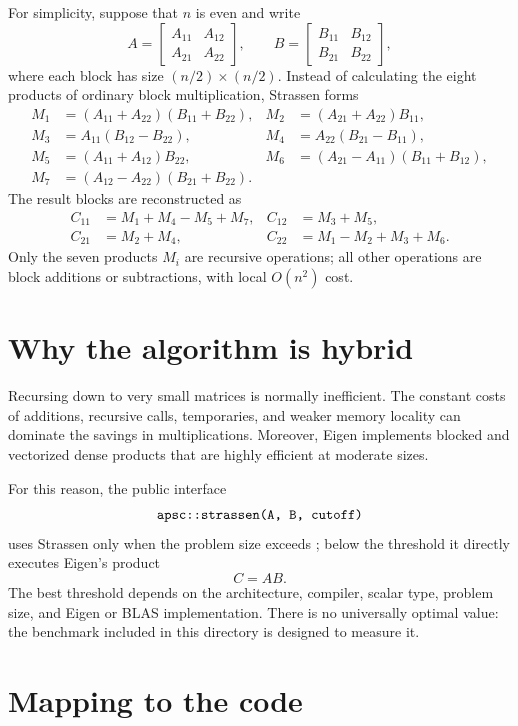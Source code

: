 \documentclass[11pt,a4paper]{article}
\newcommand{\code}[1]{\texttt{\detokenize{#1}}}
\begin{document}
For simplicity, suppose that $n$ is even and write
\[
 A=\begin{bmatrix}A_{11}&A_{12}\\A_{21}&A_{22}\end{bmatrix},
 \qquad
 B=\begin{bmatrix}B_{11}&B_{12}\\B_{21}&B_{22}\end{bmatrix},
\]
where each block has size $(n/2)\times(n/2)$. Instead of calculating the
eight products of ordinary block multiplication, Strassen forms
\begin{align*}
 M_1 &= (A_{11}+A_{22})(B_{11}+B_{22}), &
 M_2 &= (A_{21}+A_{22})B_{11}, \\
 M_3 &= A_{11}(B_{12}-B_{22}), &
 M_4 &= A_{22}(B_{21}-B_{11}), \\
 M_5 &= (A_{11}+A_{12})B_{22}, &
 M_6 &= (A_{21}-A_{11})(B_{11}+B_{12}), \\
 M_7 &= (A_{12}-A_{22})(B_{21}+B_{22}).
\end{align*}
The result blocks are reconstructed as
\begin{align*}
 C_{11} &= M_1+M_4-M_5+M_7, &
 C_{12} &= M_3+M_5, \\
 C_{21} &= M_2+M_4, &
 C_{22} &= M_1-M_2+M_3+M_6.
\end{align*}
Only the seven products $M_i$ are recursive operations; all other operations
are block additions or subtractions, with local $O(n^2)$ cost.

\section{Why the algorithm is hybrid}

Recursing down to very small matrices is normally inefficient. The constant
costs of additions, recursive calls, temporaries, and weaker memory locality
can dominate the savings in multiplications. Moreover, Eigen implements
blocked and vectorized dense products that are highly efficient at moderate
sizes.

For this reason, the public interface
\[
  \code{apsc::strassen(A, B, cutoff)}
\]
uses Strassen only when the problem size exceeds \code{cutoff}; below the
threshold it directly executes Eigen's product
\[
  C=AB.
\]
The best threshold depends on the architecture, compiler, scalar type, problem
size, and Eigen or BLAS implementation. There is no universally optimal value:
the benchmark included in this directory is designed to measure it.

\section{Mapping to the code}
\end{document}
